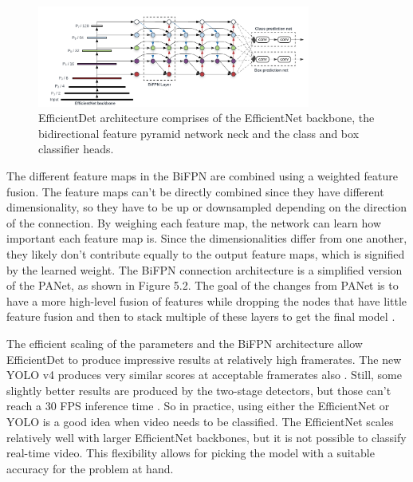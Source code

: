 \begin{figure}[h!]
    \centering
    \includegraphics[width=0.8\textwidth]{imgs/efficientDet.png}
    \caption{EfficientDet architecture comprises of the EfficientNet \citep{efficientNet} backbone, the bidirectional feature pyramid network neck and the class and box classifier heads.}
\end{figure}

The different feature maps in the BiFPN are combined using a weighted feature fusion.
The feature maps can't be directly combined since they have different dimensionality, so they have to be up or downsampled depending on the direction of the connection.
By weighing each feature map, the network can learn how important each feature map is.
Since the dimensionalities differ from one another, they likely don't contribute equally to the output feature maps, which is signified by the learned weight.
The BiFPN connection architecture is a simplified version of the PANet, as shown in Figure 5.2.
The goal of the changes from PANet is to have a more high-level fusion of features while dropping the nodes that have little feature fusion and then to stack multiple of these layers to get the final model \citep{efficientDet}.

The efficient scaling of the parameters and the BiFPN architecture allow EfficientDet to produce impressive results at relatively high framerates.
The new YOLO v4 produces very similar scores at acceptable framerates also \citep{yolov4}.
Still, some slightly better results are produced by the two-stage detectors, but those can't reach a 30 FPS inference time \citep{yolov4}.
So in practice, using either the EfficientNet or YOLO is a good idea when video needs to be classified.
The EfficientNet scales relatively well with larger EfficientNet backbones, but it is not possible to classify real-time video.
This flexibility allows for picking the model with a suitable accuracy for the problem at hand.

